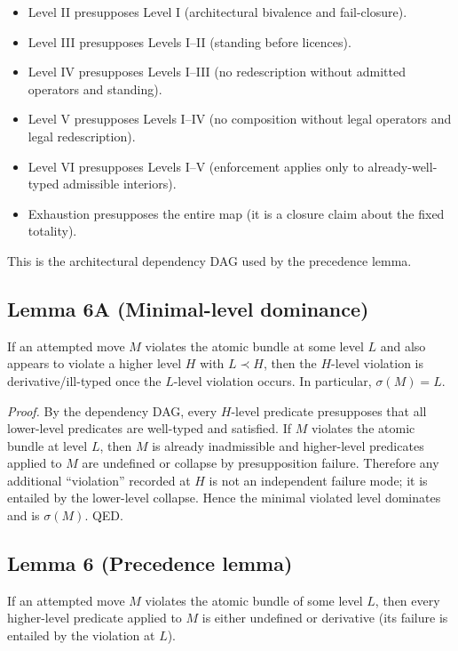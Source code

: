 \documentclass[12pt]{article}
\theoremstyle{plain}
\begin{document}
\begin{itemize}[leftmargin=*]
\item Level II presupposes Level I (architectural bivalence and fail-closure).
\item Level III presupposes Levels I--II (standing before licences).
\item Level IV presupposes Levels I--III (no redescription without admitted operators and standing).
\item Level V presupposes Levels I--IV (no composition without legal operators and legal redescription).
\item Level VI presupposes Levels I--V (enforcement applies only to already-well-typed admissible interiors).
\item Exhaustion presupposes the entire map (it is a closure claim about the fixed totality).
\end{itemize}

This is the architectural dependency DAG used by the precedence lemma.

\subsection{Lemma 6A (Minimal-level dominance)}

If an attempted move $M$ violates the atomic bundle at some level $L$ and also appears to violate a higher level $H$ with $L\prec H$, then the $H$-level violation is derivative/ill-typed once the $L$-level violation occurs. In particular, $\sigma(M)=L$.

\textit{Proof.} By the dependency DAG, every $H$-level predicate presupposes that all lower-level predicates are well-typed and satisfied. If $M$ violates the atomic bundle at level $L$, then $M$ is already inadmissible and higher-level predicates applied to $M$ are undefined or collapse by presupposition failure. Therefore any additional ``violation'' recorded at $H$ is not an independent failure mode; it is entailed by the lower-level collapse. Hence the minimal violated level dominates and is $\sigma(M)$. QED.

\subsection{Lemma 6 (Precedence lemma)}

If an attempted move $M$ violates the atomic bundle of some level $L$, then every higher-level predicate applied to $M$ is either undefined or derivative (its failure is entailed by the violation at $L$).
\end{document}
